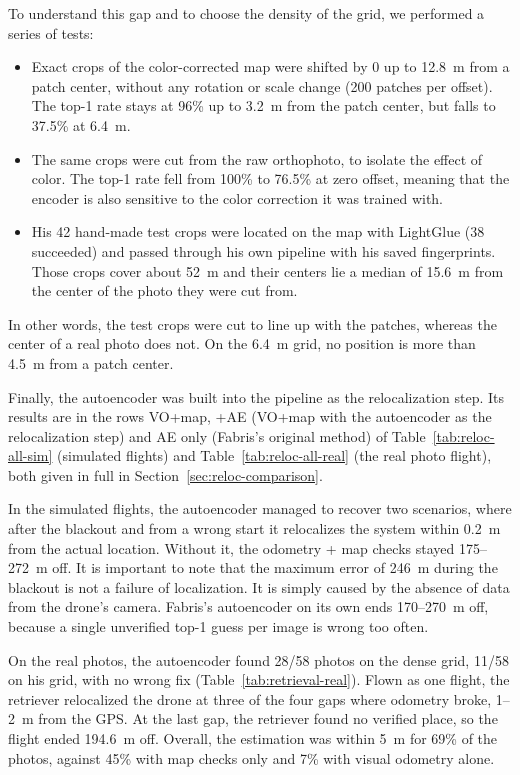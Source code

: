 \documentclass[english, Lau, oneside]{sapthesis}%
\begin{document}
To understand this gap and to choose the density of the grid, we performed a series of tests:
\begin{itemize}
\item Exact crops of the color-corrected map were shifted by 0 up to 12.8~m from a patch center, without any rotation or scale change (200 patches per offset). The top-1 rate stays at 96\% up to 3.2~m from the patch center, but falls to 37.5\% at 6.4~m.
\item The same crops were cut from the raw orthophoto, to isolate the effect of color. The top-1 rate fell from 100\% to 76.5\% at zero offset, meaning that the encoder is also sensitive to the color correction it was trained with.
\item His 42 hand-made test crops were located on the map with LightGlue (38 succeeded) and passed through his own pipeline with his saved fingerprints. Those crops cover about 52~m and their centers lie a median of 15.6~m from the center of the photo they were cut from.
\end{itemize}
In other words, the test crops were cut to line up with the patches, whereas the center of a real photo does not. On the 6.4~m grid, no position is more than 4.5~m from a patch center.

Finally, the autoencoder was built into the pipeline as the relocalization step. Its results are in the rows VO+map, +AE (VO+map with the autoencoder as the relocalization step) and AE only (Fabris's original method) of Table~\ref{tab:reloc-all-sim} (simulated flights) and Table~\ref{tab:reloc-all-real} (the real photo flight), both given in full in Section~\ref{sec:reloc-comparison}.

In the simulated flights, the autoencoder managed to recover two scenarios, where after the blackout and from a wrong start it relocalizes the system within 0.2~m from the actual location. Without it, the odometry + map checks stayed 175--272~m off. It is important to note that the maximum error of 246~m during the blackout is not a failure of localization. It is simply caused by the absence of data from the drone's camera. Fabris's autoencoder on its own ends 170--270~m off, because a single unverified top-1 guess per image is wrong too often.

On the real photos, the autoencoder found 28/58 photos on the dense grid, 11/58 on his grid, with no wrong fix (Table~\ref{tab:retrieval-real}). Flown as one flight, the retriever relocalized the drone at three of the four gaps where odometry broke, 1--2~m from the GPS. At the last gap, the retriever found no verified place, so the flight ended 194.6~m off. Overall, the estimation was within 5~m for 69\% of the photos, against 45\% with map checks only and 7\% with visual odometry alone.
\end{document}
